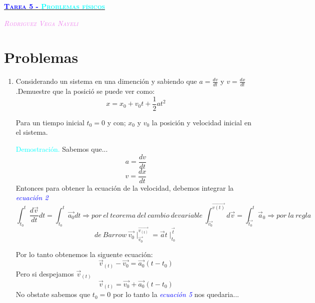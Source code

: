 \documentclass[letterpaper,12pt]{article}
\begin{document}
\pagecolor{pink}

\begin{center}
    {\underline{\textbf{\textsc{\Huge{\textcolor{blue}{Tarea 5 -} \textcolor{cyan}{Problemas físicos}}}}}}
\end{center}

\begin{center}
    {\textit{\textcolor{violet}{\textsc{Rodriguez Vega Nayeli}}}}
\end{center}
\section{Problemas}
\begin{enumerate}
    \item Considerando un sistema en una dimención y sabiendo que $a=\frac{dv}{dt}$ y $v=\frac{dx}{dt}$.Demuestre que la posició se puede ver como:
   \begin{equation}
    x=x_0+v_0t+\frac{1}{2}at^{2} 
    \end{equation}
    
    Para un tiempo inicial $t_0=0$ y con; $x_0$ y $v_0$ la posición y velocidad inicial en el sistema.

\textcolor{cyan}{Demostración.} Sabemos que...
\begin{equation}
    a=\frac{dv}{dt}
\end{equation}
\begin{equation}
    v=\frac{dx}{dt}
\end{equation}
Entonces para obtener la ecuación de la velocidad, debemos integrar la \textcolor{blue}{\textit{ecuación 2}}
  $$\int_{t_0}^{t} \frac{d\Vec{v}}{dt}dt=\int_{t_0}^{t}\Vec{a_0}dt \Rightarrow por\ el\ teorema\ del\ cambio\ devariable\ \int_{\Vec {v_0}}^{\Vec {v(t)}} d\Vec v=\int_{\Vec {t_0}}^{t} \Vec a_0  \Rightarrow por\ la\ regla $$
  $$de\ Barrow\ \Vec {v_0}\mid _{\Vec {v_0}}^{\Vec {v_{(t)}}}= \Vec{a}t \mid _{t_0}^{\Vec {t}}$$
  
Por lo tanto obtenemos la siguente ecuación:
\begin{equation}
    \Vec{v}_{(t)}-\Vec {v_0}=\Vec {a_0}(t-t_0)
\end{equation}
Pero si despejamos $\Vec{v}_{(t)}$ 
\begin{equation}
     \Vec{v}_{(t)}=\Vec {v_0}+\Vec{a_0}(t-t_0)
\end{equation}
No obstate sabemos que $t_0=0$ por lo tanto la \textcolor{blue}{\textit{ecuación 5}} nos quedaria...


\end{enumerate}
\end{document}
